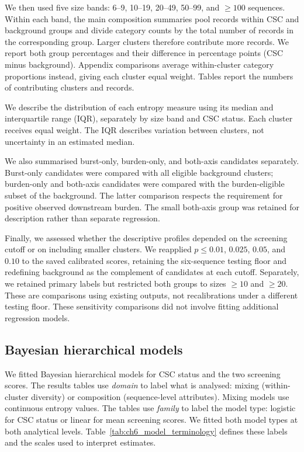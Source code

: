 We then used five size bands: 6--9, 10--19, 20--49, 50--99, and $\geq100$ sequences. Within each band, the main composition summaries pool records within CSC and background groups and divide category counts by the total number of records in the corresponding group. Larger clusters therefore contribute more records. We report both group percentages and their difference in percentage points (CSC minus background). Appendix comparisons average within-cluster category proportions instead, giving each cluster equal weight. Tables report the numbers of contributing clusters and records.

We describe the distribution of each entropy measure using its median and interquartile range (IQR), separately by size band and CSC status. Each cluster receives equal weight. The IQR describes variation between clusters, not uncertainty in an estimated median.

We also summarised burst-only, burden-only, and both-axis candidates separately. Burst-only candidates were compared with all eligible background clusters; burden-only and both-axis candidates were compared with the burden-eligible subset of the background. The latter comparison respects the requirement for positive observed downstream burden. The small both-axis group was retained for description rather than separate regression.

Finally, we assessed whether the descriptive profiles depended on the screening cutoff or on including smaller clusters. We reapplied $p\leq0.01$, $0.025$, $0.05$, and $0.10$ to the saved calibrated scores, retaining the six-sequence testing floor and redefining background as the complement of candidates at each cutoff. Separately, we retained primary labels but restricted both groups to sizes $\geq10$ and $\geq20$. These are comparisons using existing outputs, not recalibrations under a different testing floor. These sensitivity comparisons did not involve fitting additional regression models.

\subsection{Bayesian hierarchical models}\label{sec:ch6_bayesian_characterisation}

We fitted Bayesian hierarchical models for CSC status and the two screening scores. The results tables use \emph{domain} to label what is analysed: mixing (within-cluster diversity) or composition (sequence-level attributes). Mixing models use continuous entropy values. The tables use \emph{family} to label the model type: logistic for CSC status or linear for mean screening scores. We fitted both model types at both analytical levels. Table~\ref{tab:ch6_model_terminology} defines these labels and the scales used to interpret estimates.

